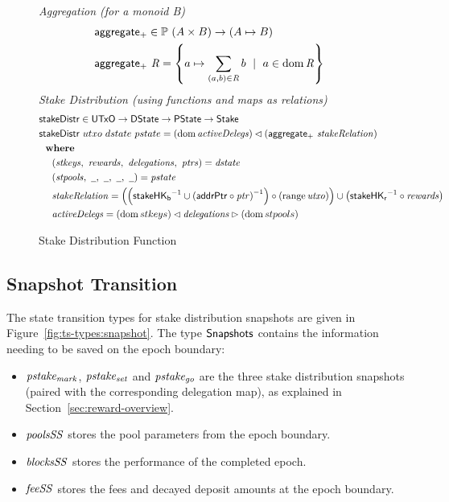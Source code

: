 \begin{figure}[htb]
  \emph{Aggregation (for a monoid B)}
  \begin{align*}
      & \mathsf{aggregate_{+}} \in \mathbb{P}~(A \times B) \to (A\mapsto B) \\
      & \mathsf{aggregate_{+}}~\mathit{R} = \left\{a\mapsto \sum_{(a,b)\in\mathit{R}}b
          ~\mid~a\in\operatorname{dom}\mathit{R}\right\} \\
  \end{align*}
  \emph{Stake Distribution (using functions and maps as relations)}
  \begin{align*}
      & \fun{stakeDistr} \in \UTxO \to \DState \to \PState \to \Stake \\
      & \fun{stakeDistr}~{utxo}~{dstate}~{pstate} =
      (\dom{\var{activeDelegs}})\restrictdom\left(\fun{aggregate_{+}}~\var{stakeRelation}\right)\\
      & \where \\
      & ~~~~ (\var{stkeys},~\var{rewards},~\var{delegations},~\var{ptrs}) = \var{dstate} \\
      & ~~~~ (\var{stpools},~\wcard,~\wcard,~\wcard,~\wcard) = \var{pstate} \\
      & ~~~~ \var{stakeRelation} = \left(
        \left(\fun{stakeHK_b}^{-1}\cup\left(\fun{addrPtr}\circ\var{ptr}\right)^{-1}\right)
        \circ\left(\range{\var{utxo}}\right)
        \right)
        \cup \left(\fun{stakeHK_r}^{-1}\circ\var{rewards}\right) \\
      & ~~~~ \var{activeDelegs} =
               (\dom{stkeys}) \restrictdom \var{delegations} \restrictrange (\dom{stpools}) \\
  \end{align*}

  \caption{Stake Distribution Function}
  \label{fig:functions:stake-distribution}
\end{figure}

\clearpage

\subsection{Snapshot Transition}
\label{sec:snapshots}

The state transition types for stake distribution snapshots are given in
Figure~\ref{fig:ts-types:snapshot}.
The type $\mathsf{\mathsf{Snapshots}}$ contains the information needing to be saved on the epoch boundary:
\begin{itemize}
  \item $\mathit{pstake_{mark}}$, $\mathit{pstake_{set}}$ and $\mathit{pstake_{go}}$ are the three
    stake distribution snapshots (paired with the corresponding delegation map),
    as explained in Section~\ref{sec:reward-overview}.
  \item $\mathit{poolsSS}$ stores the pool parameters from the epoch boundary.
  \item $\mathit{blocksSS}$ stores the performance of the completed epoch.
  \item $\mathit{feeSS}$ stores the fees and decayed deposit amounts at the epoch boundary.
\end{itemize}

